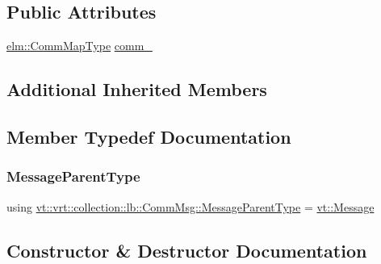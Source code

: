 \subsection*{Public Attributes}
\begin{DoxyCompactItemize}
\item 
\hyperlink{namespacevt_1_1elm_a38487cb8896b9b4763efa9022fab560e}{elm\+::\+Comm\+Map\+Type} \hyperlink{structvt_1_1vrt_1_1collection_1_1lb_1_1_comm_msg_a3caa05c2665400b33f578da839cc0674}{comm\+\_\+}
\end{DoxyCompactItemize}
\subsection*{Additional Inherited Members}


\subsection{Member Typedef Documentation}
\mbox{\label{structvt_1_1vrt_1_1collection_1_1lb_1_1_comm_msg_a4a7be71cb2b287838d055aac29caa0ed}} 
\subsubsection{\texorpdfstring{Message\+Parent\+Type}{MessageParentType}}
{\footnotesize\ttfamily using \hyperlink{structvt_1_1vrt_1_1collection_1_1lb_1_1_comm_msg_a4a7be71cb2b287838d055aac29caa0ed}{vt\+::vrt\+::collection\+::lb\+::\+Comm\+Msg\+::\+Message\+Parent\+Type} =  \hyperlink{namespacevt_a3a3ddfef40b4c90915fa43cdd5f129ea}{vt\+::\+Message}}



\subsection{Constructor \& Destructor Documentation}
\mbox{\label{structvt_1_1vrt_1_1collection_1_1lb_1_1_comm_msg_ac506bdb6c343d7e1cdef5e5d7894aa7f}} 
